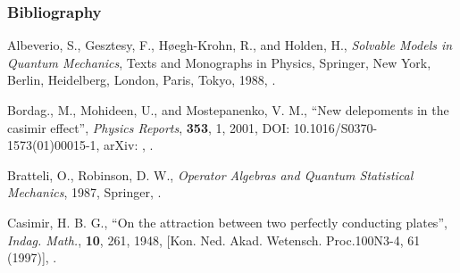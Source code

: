 \documentclass[10pt,t]{beamer}
\begin{document}
\begin{frame}
  \frametitle{Bibliography}


  \begin{thebibliography}{99}

   Albeverio, S.,
    Gesztesy, F., H{\o}egh-Krohn, R., and Holden, H., \emph{Solvable
      Models in Quantum Mechanics}, Texts and Monographs in Physics,
    Springer, New York, Berlin, Heidelberg, London, Paris, Tokyo,
    1988, \cite{AlbeverioEtAlSolvableModelsInQuantumMechanics1988}.

    Bordag., M., Mohideen, U., and Mostepanenko, V. M., ``New
    delepoments in the casimir effect'', \emph{Physics Reports},
    \textbf{353}, 1, 2001, DOI: 10.1016/S0370-1573(01)00015-1, arXiv:
    ,
    \cite{BordagMohideenMostepanenkoNewDevelopmentsCasimirEffect2001}.

   Bratteli, O.,
    Robinson, D. W., \emph{Operator Algebras and Quantum Statistical
      Mechanics}, 1987, Springer,
    \cite{BratteliRobinsonOperatorAlgebrasVolI2002}.


   Casimir, H. B. G., ``On
    the attraction between two perfectly conducting plates'',
    \emph{Indag. Math.}, \textbf{10}, 261, 1948, [Kon. Ned. Akad.
    Wetensch. Proc.100N3-4, 61 (1997)],
    \cite{CasimirOnTheAttractionBetween1948}.

  \end{thebibliography}

\end{frame}
\end{document}
